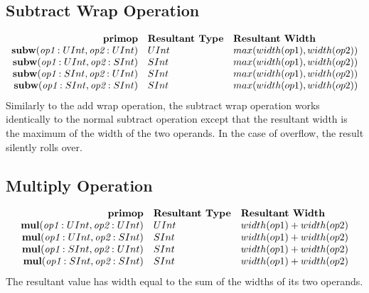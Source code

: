 \documentclass[12pt]{article}
\begin{document}
\subsection{Subtract Wrap Operation}
\[
\begin{array}{rll}
\text{\bf primop} & \text{\bf Resultant Type} & \text{\bf Resultant Width} \\
\text{\bf subw}(\text{\em op1}:UInt, \text{\em op2}:UInt) & UInt & max(width(op1),width(op2)) \\
\text{\bf subw}(\text{\em op1}:UInt, \text{\em op2}:SInt) & SInt & max(width(op1),width(op2)) \\
\text{\bf subw}(\text{\em op1}:SInt, \text{\em op2}:UInt) & SInt & max(width(op1),width(op2)) \\
\text{\bf subw}(\text{\em op1}:SInt, \text{\em op2}:SInt) & SInt & max(width(op1),width(op2)) \\
\end{array}
\]
Similarly to the add wrap operation, the subtract wrap operation works identically to the normal subtract operation except that the resultant width is the maximum of the width of the two operands.
In the case of overflow, the result silently rolls over.

\subsection{Multiply Operation}
\[
\begin{array}{rll}
\text{\bf primop} & \text{\bf Resultant Type} & \text{\bf Resultant Width} \\
\text{\bf mul}(\text{\em op1}:UInt, \text{\em op2}:UInt) &   UInt & width(op1) + width(op2)  \\
\text{\bf mul}(\text{\em op1}:UInt, \text{\em op2}:SInt) &   SInt & width(op1) + width(op2)  \\
\text{\bf mul}(\text{\em op1}:SInt, \text{\em op2}:UInt) &   SInt & width(op1) + width(op2)  \\
\text{\bf mul}(\text{\em op1}:SInt, \text{\em op2}:SInt) &   SInt & width(op1) + width(op2)  \\
\end{array}
\]
The resultant value has width equal to the sum of the widths of its two operands.
\end{document}
